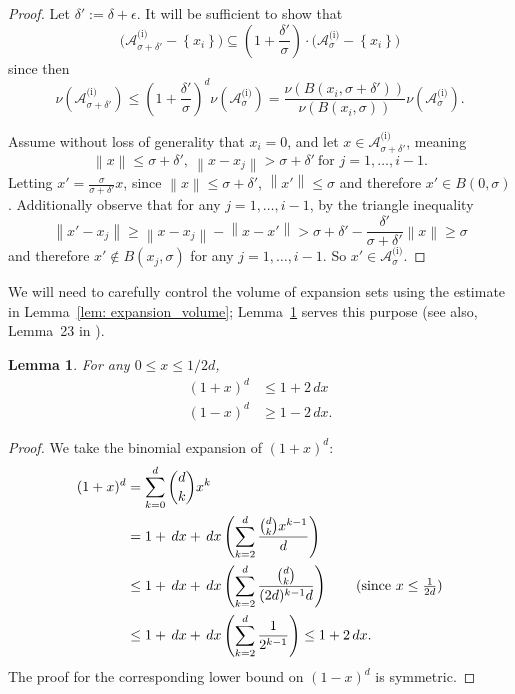 \documentclass[11pt,twoside]{article}
\newtheorem{lemma}{Lemma}
\theoremstyle{definition}
\newcommand{\set}[1]{\left\{#1\right\}}
\newcommand{\norm}[1]{\left\lVert#1\right\rVert}
\newcommand{\1}{\mathbbm{1}}
\newcommand{\Aset}{\mathcal{A}}
\newcommand{\Asig}{\Aset_{\sigma}}
\newcommand{\dx}{\,dx}
\begin{document}
\begin{proof}
	Let $\delta' := \delta + \epsilon$. It will be sufficient to show that
	\begin{equation*}
	\biggl(\Aset_{\sigma + \delta'}^{\text{(i)}} - \set{x_i}\biggr) \subseteq \left(1 + \frac{\delta'}{\sigma}\right)\cdot\biggl(\Asig^{\text{(i)}} - \set{x_i}\biggr) 
	\end{equation*}
	since then
	\begin{equation*}
	\nu(\Aset_{\sigma + \delta'}^{\text{(i)}}) \leq \left(1 + \frac{\delta'}{\sigma}\right)^d \nu(\Aset_{\sigma}^{\text{(i)}}) = \frac{\nu(B(x_i, \sigma + \delta'))}{\nu(B(x_i, \sigma))} \nu(\Aset_{\sigma}^{\text{(i)}}).
	\end{equation*}
	
	Assume without loss of generality that $x_i = 0$, and let $x \in \Aset_{\sigma + \delta'}^{\text{(i)}}$, meaning
	\begin{equation}
	\norm{x} \leq \sigma + \delta',~ \norm{x - x_j} > \sigma + \delta'~ \textrm{for $j = 1, \ldots, i - 1$}.
	\end{equation}
	Letting $x' = \frac{\sigma}{\sigma + \delta'} x$, since $\norm{x} \leq \sigma + \delta'$, $\norm{x'} \leq \sigma$ and therefore $x' \in B(0,\sigma)$. Additionally observe that for any $j = 1, \ldots, i - 1$, by the triangle inequality
	\begin{equation*}
	\norm{x' - x_j} \geq \norm{x - x_j} - \norm{x - x'} > \sigma + \delta' - \frac{\delta'}{\sigma + \delta'}\norm{x} \geq \sigma
	\end{equation*}
	and therefore $x' \not\in B(x_j,\sigma)$ for any $j = 1,\ldots, i - 1$. So $x' \in \Asig^{\text{(i)}}$.
\end{proof}

We will need to carefully control the volume of expansion sets using the estimate in Lemma~\ref{lem: expansion_volume}; Lemma~\ref{lem: Taylor_series} serves this purpose (see also, Lemma~23 in \cite{balakrishnan2013}). 
\begin{lemma}
	\label{lem: Taylor_series}
	For any $0 \leq x \leq 1/2d$,
	\begin{align*}
	(1 + x)^d & \leq 1 + 2\dx \\
	(1 - x)^d & \geq 1 - 2\dx.
	\end{align*}
\end{lemma}
\begin{proof}
	We take the binomial expansion of $(1 + x)^d$:
	\begin{align*}
	(1 + x)^d & = \sum_{k = 0}^{d} {d \choose k} x^k \\
	& = 1 + \dx + \dx\left(\sum_{k = 2}^d \frac{{d \choose k} x^{k - 1}}{d}\right)\\
	& \leq 1 + \dx + \dx\left(\sum_{k = 2}^d \frac{{d \choose k}}{(2d)^{k-1}d}\right) \tag{since $x \leq \frac{1}{2d}$} \\
	& \leq 1 + \dx + \dx\left(\sum_{k = 2}^d \frac{1}{2^{k - 1}}\right) \leq 1 + 2\dx.
	\end{align*}
The proof for the corresponding lower bound on $(1 - x)^d$ is symmetric.
\end{proof}
\end{document}
